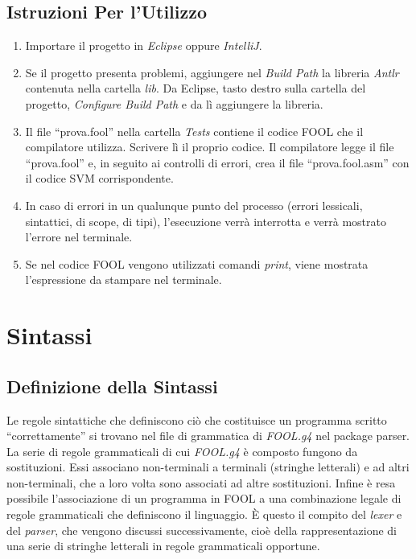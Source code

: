\documentclass{scrreprt}
\begin{document}
\section{Istruzioni Per l'Utilizzo}
\begin{enumerate}
    \item Importare il progetto in \textit{Eclipse} oppure \textit{IntelliJ}.
    \item Se il progetto presenta problemi, aggiungere nel \textit{Build Path} la libreria \textit{Antlr} contenuta nella cartella \textit{lib}.
        Da Eclipse, tasto destro sulla cartella del progetto, \textit{Configure Build Path} e da lì aggiungere la libreria.
    \item Il file ``prova.fool'' nella cartella \textit{Tests} contiene il codice FOOL che il compilatore utilizza. Scrivere lì il proprio codice. 
        Il compilatore legge il file ``prova.fool'' e, in seguito ai controlli di errori, crea il file ``prova.fool.asm'' con il codice SVM corrispondente.
    \item In caso di errori in un qualunque punto del processo (errori lessicali, sintattici, di scope, di tipi), l'esecuzione verrà interrotta e verrà mostrato l'errore
        nel terminale.
    \item Se nel codice FOOL vengono utilizzati comandi \textit{print}, viene mostrata l'espressione da stampare nel terminale. 
\end{enumerate}

\chapter{Sintassi}

\section{Definizione della Sintassi}
Le regole sintattiche che definiscono ciò che costituisce un programma scritto ``correttamente'' si 
trovano nel file di grammatica di \textit{FOOL.g4} nel package parser.\\

La serie di regole grammaticali di cui \textit{FOOL.g4} è composto fungono da sostituzioni. Essi associano 
non-terminali a terminali (stringhe letterali) e ad altri non-terminali, che a loro volta sono associati 
ad altre sostituzioni. Infine è resa possibile l’associazione di un programma in FOOL a una combinazione legale
di regole grammaticali che definiscono il linguaggio. 
È questo il compito del \textit{lexer} e del \textit{parser}, che vengono discussi successivamente, cioè della 
rappresentazione di una serie di stringhe letterali in regole grammaticali opportune. \\
\end{document}
